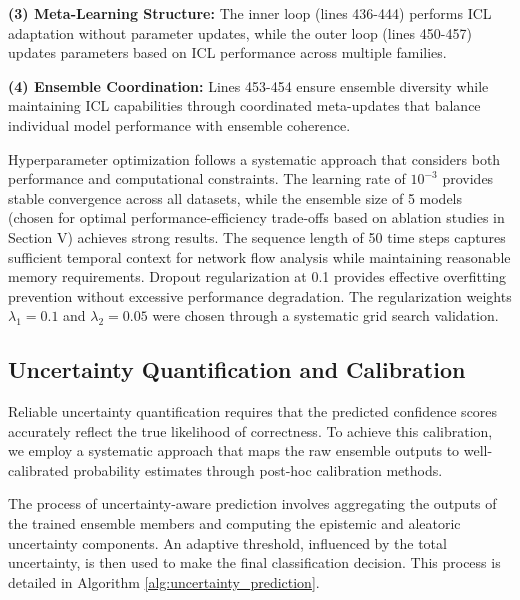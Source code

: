 \documentclass[journal]{IEEEtran}
\begin{document}
\textbf{(3) Meta-Learning Structure:} The inner loop (lines 436-444) performs ICL adaptation without parameter updates, while the outer loop (lines 450-457) updates parameters based on ICL performance across multiple families.

\textbf{(4) Ensemble Coordination:} Lines 453-454 ensure ensemble diversity while maintaining ICL capabilities through coordinated meta-updates that balance individual model performance with ensemble coherence.

Hyperparameter optimization follows a systematic approach that considers both performance and computational constraints. The learning rate of $10^{-3}$ provides stable convergence across all datasets, while the ensemble size of 5 models (chosen for optimal performance-efficiency trade-offs based on ablation studies in Section V) achieves strong results. The sequence length of 50 time steps captures sufficient temporal context for network flow analysis while maintaining reasonable memory requirements. Dropout regularization at 0.1 provides effective overfitting prevention without excessive performance degradation. The regularization weights $\lambda_1 = 0.1$ and $\lambda_2 = 0.05$ were chosen through a systematic grid search validation.

\subsection{Uncertainty Quantification and Calibration}

Reliable uncertainty quantification requires that the predicted confidence scores accurately reflect the true likelihood of correctness. To achieve this calibration, we employ a systematic approach that maps the raw ensemble outputs to well-calibrated probability estimates through post-hoc calibration methods.

The process of uncertainty-aware prediction involves aggregating the outputs of the trained ensemble members and computing the epistemic and aleatoric uncertainty components. An adaptive threshold, influenced by the total uncertainty, is then used to make the final classification decision. This process is detailed in Algorithm \ref{alg:uncertainty_prediction}.
\end{document}
